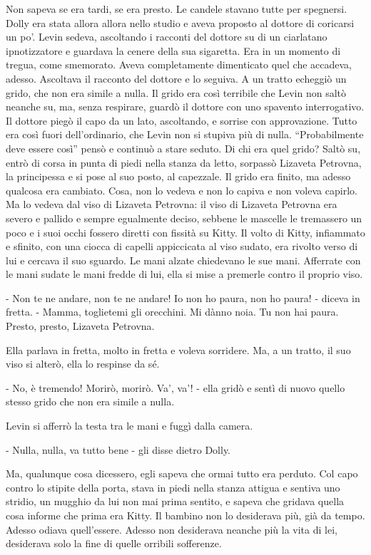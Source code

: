 \label{xv-6} 

Non sapeva se era tardi, se era presto. Le candele stavano tutte per spegnersi. Dolly era stata allora allora nello studio e aveva proposto al dottore di coricarsi un po'. Levin sedeva, ascoltando i racconti del dottore su di un ciarlatano ipnotizzatore e guardava la cenere della sua sigaretta. Era in un momento di tregua, come smemorato. Aveva completamente dimenticato quel che accadeva, adesso. Ascoltava il racconto del dottore e lo seguiva. A un tratto echeggiò un grido, che non era simile a nulla. Il grido era così terribile che Levin non saltò neanche su, ma, senza respirare, guardò il dottore con uno spavento interrogativo. Il dottore piegò il capo da un lato, ascoltando, e sorrise con approvazione. Tutto era così fuori dell'ordinario, che Levin non si stupiva più di nulla. ``Probabilmente deve essere così'' pensò e continuò a stare seduto. Di chi era quel grido? Saltò su, entrò di corsa in punta di piedi nella stanza da letto, sorpassò Lizaveta Petrovna, la principessa e si pose al suo posto, al capezzale. Il grido era finito, ma adesso qualcosa era cambiato. Cosa, non lo vedeva e non lo capiva e non voleva capirlo. Ma lo vedeva dal viso di Lizaveta Petrovna: il viso di Lizaveta Petrovna era severo e pallido e sempre egualmente deciso, sebbene le mascelle le tremassero un poco e i suoi occhi fossero diretti con fissità su Kitty. Il volto di Kitty, infiammato e sfinito, con una ciocca di capelli appiccicata al viso sudato, era rivolto verso di lui e cercava il suo sguardo. Le mani alzate chiedevano le sue mani. Afferrate con le mani sudate le mani fredde di lui, ella si mise a premerle contro il proprio viso. 

- Non te ne andare, non te ne andare! Io non ho paura, non ho paura! - diceva in fretta. - Mamma, toglietemi gli orecchini. Mi dànno noia. Tu non hai paura. Presto, presto, Lizaveta Petrovna. 

Ella parlava in fretta, molto in fretta e voleva sorridere. Ma, a un tratto, il suo viso si alterò, ella lo respinse da sé. 

- No, è tremendo! Morirò, morirò. Va', va'! - ella gridò e sentì di nuovo quello stesso grido che non era simile a nulla. 

Levin si afferrò la testa tra le mani e fuggì dalla camera. 

- Nulla, nulla, va tutto bene - gli disse dietro Dolly. 

Ma, qualunque cosa dicessero, egli sapeva che ormai tutto era perduto. Col capo contro lo stipite della porta, stava in piedi nella stanza attigua e sentiva uno stridio, un mugghio da lui non mai prima sentito, e sapeva che gridava quella cosa informe che prima era Kitty. Il bambino non lo desiderava più, già da tempo. Adesso odiava quell'essere. Adesso non desiderava neanche più la vita di lei, desiderava solo la fine di quelle orribili sofferenze. 

